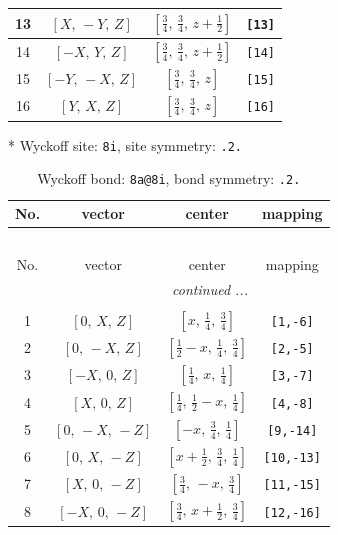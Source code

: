 \documentclass[fleqn,8pt]{jsarticle}
\begin{document}
\begin{longtable}{cccc}
13 & $\left[ X,\, - Y,\, Z \right]$ & $\left[ \frac{3}{4},\, \frac{3}{4},\, z + \frac{1}{2} \right]$ & {\tt [13]} \\ \hline
14 & $\left[ - X,\, Y,\, Z \right]$ & $\left[ \frac{3}{4},\, \frac{3}{4},\, z + \frac{1}{2} \right]$ & {\tt [14]} \\ \hline
15 & $\left[ - Y,\, - X,\, Z \right]$ & $\left[ \frac{3}{4},\, \frac{3}{4},\, z \right]$ & {\tt [15]} \\ \hline
16 & $\left[ Y,\, X,\, Z \right]$ & $\left[ \frac{3}{4},\, \frac{3}{4},\, z \right]$ & {\tt [16]} \\
\end{longtable}
* Wyckoff site: {\tt 8i}, site symmetry: {\tt .2.}
\renewcommand{\arraystretch}{1.2}
\begin{longtable}{cccc}
\caption{Wyckoff bond: {\tt 8a@8i}, bond symmetry: {\tt .2.}}
 \\
 \hline \hline
No. & vector & center & mapping \\ \hline \endfirsthead

\multicolumn{3}{l}{\tablename\ \thetable{}} \\
 \hline \hline
No. & vector & center & mapping \\ \hline \endhead

 \hline \hline
\multicolumn{3}{r}{\footnotesize\it continued ...} \\ \endfoot

 \hline \hline
\multicolumn{3}{r}{} \\ \endlastfoot

1 & $\left[ 0,\, X,\, Z \right]$ & $\left[ x,\, \frac{1}{4},\, \frac{3}{4} \right]$ & {\tt [1,-6]} \\ \hline
2 & $\left[ 0,\, - X,\, Z \right]$ & $\left[ \frac{1}{2} - x,\, \frac{1}{4},\, \frac{3}{4} \right]$ & {\tt [2,-5]} \\ \hline
3 & $\left[ - X,\, 0,\, Z \right]$ & $\left[ \frac{1}{4},\, x,\, \frac{1}{4} \right]$ & {\tt [3,-7]} \\ \hline
4 & $\left[ X,\, 0,\, Z \right]$ & $\left[ \frac{1}{4},\, \frac{1}{2} - x,\, \frac{1}{4} \right]$ & {\tt [4,-8]} \\ \hline
5 & $\left[ 0,\, - X,\, - Z \right]$ & $\left[ - x,\, \frac{3}{4},\, \frac{1}{4} \right]$ & {\tt [9,-14]} \\ \hline
6 & $\left[ 0,\, X,\, - Z \right]$ & $\left[ x + \frac{1}{2},\, \frac{3}{4},\, \frac{1}{4} \right]$ & {\tt [10,-13]} \\ \hline
7 & $\left[ X,\, 0,\, - Z \right]$ & $\left[ \frac{3}{4},\, - x,\, \frac{3}{4} \right]$ & {\tt [11,-15]} \\ \hline
8 & $\left[ - X,\, 0,\, - Z \right]$ & $\left[ \frac{3}{4},\, x + \frac{1}{2},\, \frac{3}{4} \right]$ & {\tt [12,-16]} \\
\end{longtable}
\end{document}
